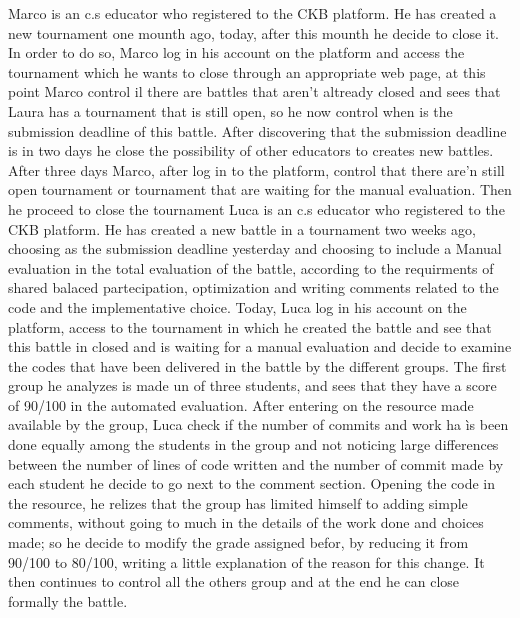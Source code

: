\documentclass{article}
\newcounter{subsubsubsection}[subsubsection]
\begin{document}
{            
                Marco is an c.s educator who registered to the CKB platform. He has created a new tournament one mounth ago, today, after this mounth he decide to close it. In order to do so, Marco log in his account on the platform and access the tournament which he wants to close through an appropriate web page, at this point Marco control il there are battles that aren't altready closed and sees that Laura has a tournament that is still open, so he now control when is the submission deadline of this battle. After discovering that the submission deadline is in two days he close the possibility of other educators to creates new battles.
                After three days Marco, after log in to the platform, control that there are'n still open tournament or tournament that are waiting for the manual evaluation. Then he proceed to close the tournament
                Luca is an c.s educator who registered to the CKB platform. He has created a new battle in a tournament two weeks ago, choosing as the submission deadline yesterday and choosing to include a Manual evaluation in the total evaluation of the battle, according to the requirments of shared balaced partecipation, optimization and writing comments related to the code and the implementative choice.
                Today, Luca log in his account on the platform, access to the tournament in which he created the battle and see that this battle in closed and is waiting for a manual evaluation and decide to examine the codes that have been delivered in the battle by the different groups.
                The first group he analyzes is made un of three students, and sees that they have a score of 90/100 in the automated evaluation. After entering on the resource made available by the group, Luca check if the number of commits and work ha ìs been done equally among the students in the group and not noticing large differences between the number of lines of code written and the number of commit made by each student he decide to go next to the comment section.
                Opening the code in the resource, he relizes that the group has limited himself to adding simple comments, without going to much in the details of the work done and choices made; so he decide to modify the grade assigned befor, by reducing it from 90/100 to 80/100, writing a little explanation of the reason for this change. It then continues to control all the others group and at the end he can close formally the battle.
}
\end{document}
